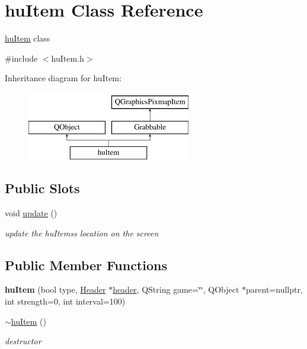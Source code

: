 \hypertarget{classhuItem}{\section{hu\-Item Class Reference}
\label{classhuItem}
}


\hyperlink{classhuItem}{hu\-Item} class  




{\ttfamily \#include $<$hu\-Item.\-h$>$}

Inheritance diagram for hu\-Item\-:\begin{figure}[H]
\begin{center}
\leavevmode
\includegraphics[height=3.000000cm]{classhuItem}
\end{center}
\end{figure}
\subsection*{Public Slots}
\begin{DoxyCompactItemize}
\item 
void \hyperlink{classhuItem_a3737ba343f040fed15febc7ef3e5ad52}{update} ()
\begin{DoxyCompactList}\small\item\em update the hu\-Itemss location on the screen \end{DoxyCompactList}\end{DoxyCompactItemize}
\subsection*{Public Member Functions}
\begin{DoxyCompactItemize}
\item 
\hypertarget{classhuItem_ab48bd1dc8b738ff323a8d72d4cbb4824}{{\bfseries hu\-Item} (bool type, \hyperlink{classHeader}{Header} $\ast$\hyperlink{classGrabbable_a97db8193dec83a8086352f80a30b2038}{header}, Q\-String game=\char`\"{}\char`\"{}, Q\-Object $\ast$parent=nullptr, int strength=0, int interval=100)}\label{classhuItem_ab48bd1dc8b738ff323a8d72d4cbb4824}

\item 
\hypertarget{classhuItem_a983ca578205dec2de2da458a9b055e5a}{\hyperlink{classhuItem_a983ca578205dec2de2da458a9b055e5a}{$\sim$hu\-Item} ()}\label{classhuItem_a983ca578205dec2de2da458a9b055e5a}

\begin{DoxyCompactList}\small\item\em destructor \end{DoxyCompactList}\end{DoxyCompactItemize}
